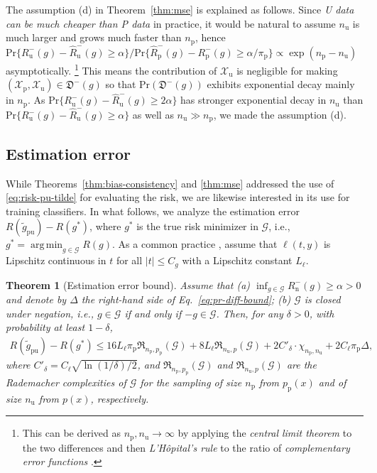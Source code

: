 \documentclass{article}
\newtheorem{theorem}{Theorem}
\DeclareMathOperator*{\argmin}{\mathrm{arg\,min}}
\newcommand{\pr}{\mathrm{Pr}}
\newcommand{\cG}{\mathcal{G}}
\newcommand{\cX}{\mathcal{X}}
\newcommand{\fD}{\mathfrak{D}}
\newcommand{\fR}{\mathfrak{R}}
\newcommand{\prp}{p_\mathrm{p}}
\newcommand{\pip}{\pi_\mathrm{p}}
\newcommand{\Xp}{\cX_\mathrm{p}}
\newcommand{\Xu}{\cX_\mathrm{u}}
\newcommand{\Np}{{n_\mathrm{p}}}
\newcommand{\Nu}{{n_\mathrm{u}}}
\newcommand{\Rp}{R_\mathrm{p}}
\newcommand{\Rn}{R_\mathrm{n}}
\newcommand{\Ru}{R_\mathrm{u}}
\newcommand{\hRp}{\widehat{R}_\mathrm{p}}
\newcommand{\hRu}{\widehat{R}_\mathrm{u}}
\newcommand{\tgpu}{\widetilde{g}_\mathrm{pu}}
\begin{document}
The assumption (d) in Theorem~\ref{thm:mse} is explained as follows. Since \emph{U data can be much cheaper than P data} in practice, it would be natural to assume $\Nu$ is much larger and grows much faster than $\Np$, hence $\pr\{\Ru^-(g)-\hRu^-(g)\ge\alpha\}/\pr\{\hRp^-(g)-\Rp^-(g)\ge\alpha/\pip\}
\propto \exp(\Np-\Nu)$ asymptotically.%
\footnote{This can be derived as $\Np,\Nu\to\infty$ by applying the \emph{central limit theorem} to the two differences and then \emph{L'H\^{o}pital's rule} to the ratio of \emph{complementary error functions} \citep{chung68CPT}.}
This means the contribution of $\Xu$ is negligible for making $(\Xp,\Xu)\in\fD^-(g)$ so that $\pr(\fD^-(g))$ exhibits exponential decay mainly in $\Np$. As $\pr\{\Ru^-(g)-\hRu^-(g)\ge2\alpha\}$ has stronger exponential decay in $\Nu$ than $\pr\{\Ru^-(g)-\hRu^-(g)\ge\alpha\}$ as well as $\Nu\gg\Np$, we made the assumption (d).

\subsection{Estimation error}%

While Theorems~\ref{thm:bias-consistency} and \ref{thm:mse} addressed the use of \eqref{eq:risk-pu-tilde} for evaluating the risk, we are likewise interested in its use for training classifiers. In what follows, we analyze the estimation error $R(\tgpu)-R(g^*)$, where $g^*$ is the true risk minimizer in $\cG$, i.e., $g^*=\argmin_{g\in\cG}R(g)$. As a common practice \citep{mohri12FML}, assume that $\ell(t,y)$ is Lipschitz continuous in $t$ for all $|t|\le C_g$ with a Lipschitz constant $L_\ell$.

\begin{theorem}[Estimation error bound]
  \label{thm:est-err}%
  Assume that
  (a) $\inf_{g\in\cG}\Rn^-(g)\ge\alpha>0$ and denote by $\Delta$ the right-hand side of Eq.~\eqref{eq:pr-diff-bound};
  (b) $\cG$ is closed under negation, i.e., $g\in\cG$ if and only if $-g\in\cG$.
  Then, for any $\delta>0$, with probability at least $1-\delta$,
  \begin{align}
  \label{eq:est-err-bound}%
  R(\tgpu)-R(g^*)
  \le 16L_\ell\pip\fR_{\Np,\prp}(\cG)
  +8L_\ell\fR_{\Nu,p}(\cG)
  +2C'_\delta\cdot\chi_{\Np,\Nu} +2C_\ell\pip\Delta,
  \end{align}
  where $C'_\delta=C_\ell\sqrt{\ln(1/\delta)/2}$, and $\fR_{\Np,\prp}(\cG)$ and $\fR_{\Nu,p}(\cG)$ are the Rademacher complexities of $\cG$ for the sampling of size $\Np$ from $\prp(x)$ and of size $\Nu$ from $p(x)$, respectively.
\end{theorem}
\end{document}
